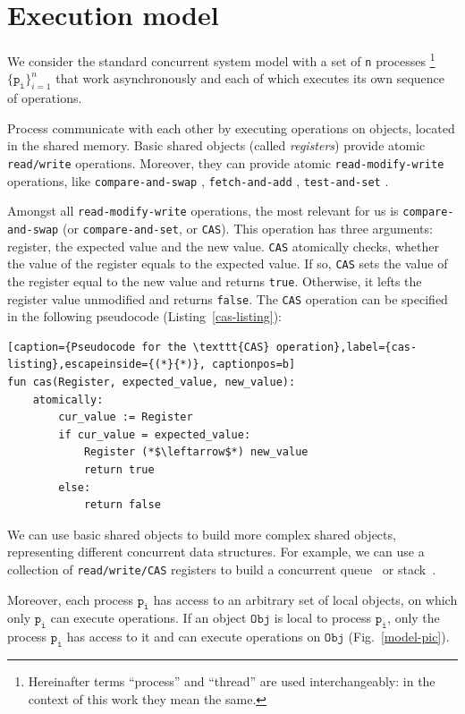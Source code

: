 \documentclass[times, dvipsnames,%
               languages={russian,english} %
              ]{itmo-student-thesis}
\begin{document}
\section{Execution model}

We consider the standard concurrent system model with a set of \texttt{n} processes \footnote{Hereinafter terms ``process'' and ``thread'' are used interchangeably: in the context of this work they mean the same.} $\{\texttt{p}_{\texttt{i}}\}_{i = 1}^n$ that work asynchronously and each of which executes its own sequence of operations.

Process communicate with each other by executing operations on objects, located in the shared memory. Basic shared objects (called \emph{registers}) provide atomic \texttt{read/write} operations. Moreover, they can provide atomic \texttt{read-modify-write} operations, like \texttt{compare-and-swap} \cite{compare-and-swap}, \texttt{fetch-and-add} \cite{fetch-and-add}, \texttt{test-and-set} \cite{test-and-set}.

Amongst all \texttt{read-modify-write} operations, the most relevant for us is \texttt{compare-and-swap} (or \texttt{compare-and-set}, or \texttt{CAS}). This operation has three arguments: register, the expected value and the new value. \texttt{CAS} atomically checks, whether the value of the register equals to the expected value. If so, \texttt{CAS} sets the value of the register equal to the new value and returns \texttt{true}. Otherwise, it lefts the register value unmodified and returns \texttt{false}. The \texttt{CAS} operation can be specified in the following pseudocode (Listing~\ref{cas-listing}):

\renewcommand{\lstlistingname}{Listing}
\begin{lstlisting}[caption={Pseudocode for the \texttt{CAS} operation},label={cas-listing},escapeinside={(*}{*)}, captionpos=b]
fun cas(Register, expected_value, new_value):
    atomically:
        cur_value := Register
        if cur_value = expected_value:
            Register (*$\leftarrow$*) new_value
            return true
        else:
            return false
\end{lstlisting}

We can use basic shared objects to build more complex shared objects, representing different concurrent data structures. For example, we can use a collection of \texttt{read/write/CAS} registers to build a concurrent queue~\cite{michael1996simple} or stack~\cite{treiber1986systems}.

Moreover, each process $\texttt{p}_{\texttt{i}}$ has access to an arbitrary set of local objects, on which only $\texttt{p}_{\texttt{i}}$ can execute operations. If an object $\texttt{Obj}$ is local to process $\texttt{p}_{\texttt{i}}$, only the process $\texttt{p}_{\texttt{i}}$ has access to it and can execute operations on $\texttt{Obj}$ (Fig.~\ref{model-pic}).
\end{document}
